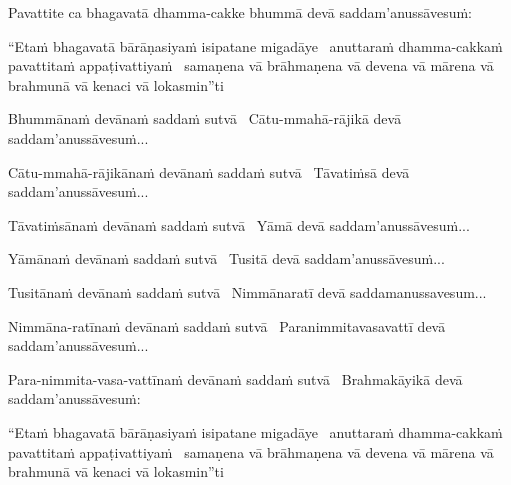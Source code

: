 \begin{pali-hang}
  Pavattite ca bhagavatā dhamma-cakke bhummā devā saddam'anussāvesuṁ:
\end{pali-hang}

\begin{pali-hang}
  ``Etaṁ bhagavatā bārāṇasiyaṁ isipatane migadāye \breathmark\ anuttaraṁ dhamma-cakkaṁ pavattitaṁ appaṭivattiyaṁ \breathmark\ samaṇena vā brāhmaṇena vā devena vā mārena vā brahmunā vā kenaci vā lokasmin''ti
\end{pali-hang}

\begin{pali-hang}
  Bhummānaṁ devānaṁ saddaṁ sutvā \breathmark\ Cātu-mmahā-rājikā devā saddam'anussāvesuṁ...
\end{pali-hang}

\begin{pali-hang}
  Cātu-mmahā-rājikānaṁ devānaṁ saddaṁ sutvā \breathmark\ Tāvatiṁsā devā saddam'anussāvesuṁ...
\end{pali-hang}

\begin{pali-hang}
  Tāvatiṁsānaṁ devānaṁ saddaṁ sutvā \breathmark\ Yāmā devā saddam'anussāvesuṁ...
\end{pali-hang}

\begin{pali-hang}
  Yāmānaṁ devānaṁ saddaṁ sutvā \breathmark\ Tusitā devā saddam'anussāvesuṁ...
\end{pali-hang}

\begin{pali-hang}
  Tusitānaṁ devānaṁ saddaṁ sutvā \breathmark\ Nimmānaratī devā saddamanussavesum...
\end{pali-hang}

\begin{pali-hang}
  Nimmāna-ratīnaṁ devānaṁ saddaṁ sutvā \breathmark\ Paranimmitavasavattī devā saddam'anussāvesuṁ...
\end{pali-hang}

\begin{pali-hang}
  Para-nimmita-vasa-vattīnaṁ devānaṁ saddaṁ sutvā \breathmark\ Brahmakāyikā devā saddam'anussāvesuṁ:
\end{pali-hang}

\begin{pali-hang}
  ``Etaṁ bhagavatā bārāṇasiyaṁ isipatane migadāye \breathmark\ anuttaraṁ dhamma-cakkaṁ pavattitaṁ appaṭivattiyaṁ \breathmark\ samaṇena vā brāhmaṇena vā devena vā mārena vā brahmunā vā kenaci vā lokasmin''ti
\end{pali-hang}

